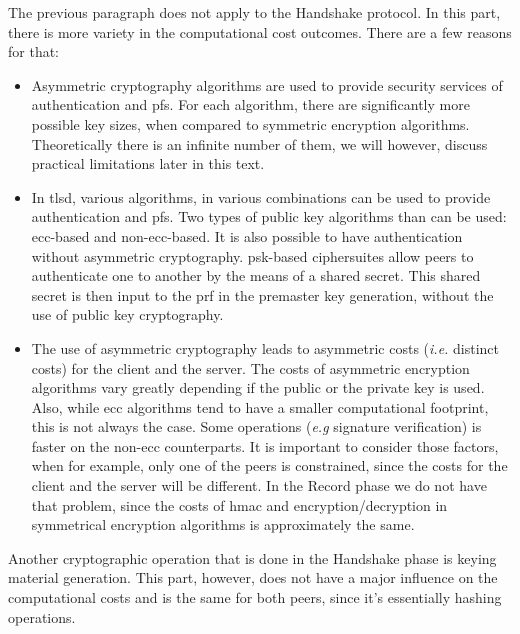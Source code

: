 \documentclass{llncs}
\begin{document}
The previous paragraph does not apply to the Handshake protocol. In this part, there is more variety in the
computational cost outcomes. There are a few reasons for that:

\begin{itemize}

  \item Asymmetric cryptography algorithms are used to provide security services of authentication
  and \gls{pfs}. For each algorithm, there are significantly more possible key sizes, when compared to
  symmetric encryption algorithms. Theoretically there is an infinite number of them, we will however, discuss
  practical limitations later in this text.

  \item In \gls{tlsd}, various algorithms, in various combinations can be used to provide authentication and \gls{pfs}.
  Two types of public key algorithms than can be used: \gls{ecc}-based and non-\gls{ecc}-based. It is also possible
  to have authentication without asymmetric cryptography. \gls{psk}-based ciphersuites allow peers to
  authenticate one to another by the means of a shared secret. This shared secret is then input to the \gls{prf}
  in the premaster key generation, without the use of public key cryptography.

  \item The use of asymmetric cryptography leads to asymmetric costs (\textit{i.e.} distinct costs) for the client and the server. The costs of asymmetric
  encryption algorithms vary greatly depending if the public or the private key is used. Also, while \gls{ecc}
  algorithms tend to have a smaller computational footprint, this is not always the case.
  Some operations (\textit{e.g} signature verification) is faster on the non-\gls{ecc} counterparts.
  It is important to consider those factors, when for example, only one of the peers is constrained, since the costs for the client and the server will be different.
  In the Record phase we do not have that problem, since the costs of \gls{hmac} and encryption/decryption in
  symmetrical encryption algorithms is approximately the same.

\end{itemize}

Another cryptographic operation that is done in the Handshake phase is keying material generation. This part, however,
does not have a major influence on the computational costs and is the same for both peers, since it's essentially
hashing operations.
\end{document}
